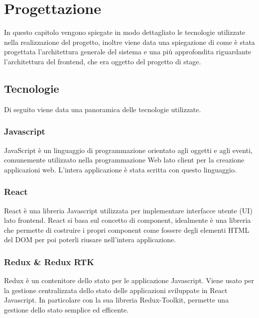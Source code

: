 
\chapter{Progettazione}
\label{cap:progettazione}

In questo capitolo vengono spiegate in modo dettagliato le tecnologie utilizzate nella realizzazione del progetto, inoltre viene data una spiegazione di come è
stata progettata l'architettura generale del sistema e una più approfondita riguardante l'architettura del frontend, che era oggetto del progetto di stage.

\section{Tecnologie}

Di seguito viene data una panoramica delle tecnologie utilizzate.

\subsection*{Javascript}
JavaScript è un linguaggio di programmazione orientato agli oggetti e agli eventi, comunemente utilizzato nella programmazione Web lato client per la creazione applicazioni web.
L'intera applicazione è stata scritta con questo linguaggio.

\subsection*{React}
React è una libreria Javascript utilizzata per implementare interfacce utente (UI) lato frontend. React si basa sul concetto di component, idealmente è una libreria che permette di
costruire i propri component come fossere degli elementi HTML del DOM per poi poterli riusare nell'intera applicazione.

\subsection*{Redux \& Redux RTK}
Redux è un contenitore dello stato per le applicazione Javascript. Viene usato per la gestione centralizzata dello stato delle applicazioni sviluppate in React Javascript.
In particolare con la sua libreria Redux-Toolkit, permette una gestione dello stato semplice ed efficente.

